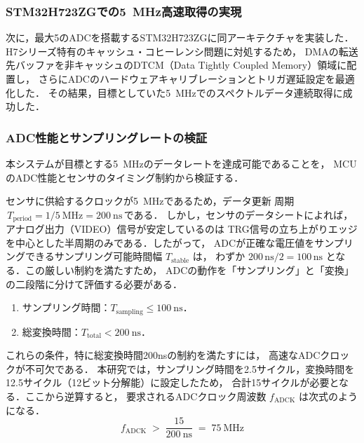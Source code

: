 \documentclass[main]{subfiles}
\begin{document}
\subsubsection{STM32H723ZGでの\SI{5}{\mega\hertz}高速取得の実現}
次に，最大\SI{5}{\MSPS}のADCを搭載するSTM32H723ZGに同アーキテクチャを実装した．
H7シリーズ特有のキャッシュ・コヒーレンシ問題に対処するため，
DMAの転送先バッファを非キャッシュのDTCM（Data Tightly Coupled Memory）領域に配置し，
さらにADCのハードウェアキャリブレーションとトリガ遅延設定を最適化した．
その結果，目標としていた\SI{5}{\mega\hertz}でのスペクトルデータ連続取得に成功した．

\subsubsection{ADC性能とサンプリングレートの検証}
本システムが目標とする\SI{5}{\mega\hertz}のデータレートを達成可能であることを，
MCUのADC性能とセンサのタイミング制約から検証する．

センサに供給するクロックが\SI{5}{\mega\hertz}であるため，データ更新
周期\(\,T_{\text{period}} = 1 / \SI{5}{\mega\hertz} = \SI{200}{\nano\second}\,\)である．
しかし，センサのデータシートによれば，アナログ出力（VIDEO）信号が安定しているのは
TRG信号の立ち上がりエッジを中心とした半周期のみである．したがって，
ADCが正確な電圧値をサンプリングできるサンプリング可能時間幅 $T_{\text{stable}}$ は，
わずか $200 \, \text{ns} / 2 = 100 \, \text{ns}$ となる．この厳しい制約を満たすため，
ADCの動作を「サンプリング」と「変換」の二段階に分けて評価する必要がある．
\begin{enumerate}\setlength{\itemsep}{0pt}
  \item サンプリング時間：\(T_{\mathrm{sampling}} \le \SI{100}{\nano\second}\)．
  \item 総変換時間：\(T_{\mathrm{total}} < \SI{200}{\nano\second}\)．
\end{enumerate}


これらの条件，特に総変換時間200nsの制約を満たすには，
高速なADCクロックが不可欠である．
本研究では，サンプリング時間を2.5サイクル，変換時間を
12.5サイクル（12ビット分解能）に設定したため，
合計15サイクルが必要となる．ここから逆算すると，
要求されるADCクロック周波数 \(f_{\mathrm{ADCK}}\) は次式のようになる．
\begin{equation}
  f_{\mathrm{ADCK}} \;>\; \frac{15}{\SI{200}{\nano\second}} \;=\; \SI{75}{\mega\hertz}
  \label{eq:fadck_requirement}
\end{equation}
\end{document}
